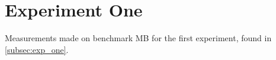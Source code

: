 \section{Experiment One}\label{app:exp_one}

Measurements made on benchmark MB for the first experiment, found in \cref{subsec:exp_one}.

% 
% 



% 



